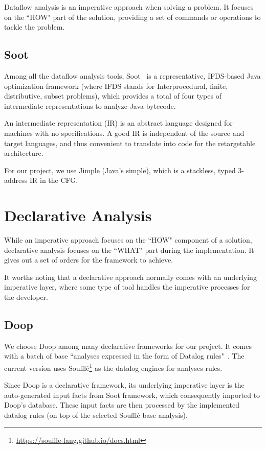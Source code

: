 Dataflow analysis is an imperative approach when solving a problem. It focuses on the ``HOW" part of the solution, providing a set of commands or operations to tackle the problem.

\subsection{Soot}

Among all the dataflow analysis tools, Soot~\cite{Vallee-Rai:1999:SJB:781995.782008} is a representative, IFDS-based Java optimization framework (where IFDS stands for Interprocedural, finite, distributive, subset problems), which provides a total of four types of intermediate representations to analyze Java bytecode. 

An intermediate representation (IR) is an abstract language designed for machines with no specifications. A good IR is independent of the source and target languages, and thus convenient to translate into code for the retargetable architecture.

For our project, we use Jimple (Java's simple), which is a stackless, typed 3-address IR in the CFG.

\section{Declarative Analysis}

While an imperative approach focuses on the ``HOW" component of a solution, declarative analysis focuses on the ``WHAT" part during the implementation. It gives out a set of orders for the framework to achieve.

It worths noting that a declarative approach normally comes with an underlying imperative layer, where some type of tool handles the imperative processes for the developer.

\subsection{Doop}

We choose Doop among many declarative frameworks for our project. It comes with a batch of base ``analyses expressed in the form of Datalog rules"~\cite{doop-repo}. The current version uses Soufflé\footnote{\url{https://souffle-lang.github.io/docs.html}} as the datalog engines for analyses rules.

Since Doop is a declarative framework, its underlying imperative layer is the auto-generated input facts from Soot framework, which consequently imported to Doop's database. These input facts are then processed by the implemented datalog rules (on top of the selected Soufflé base analysis).


